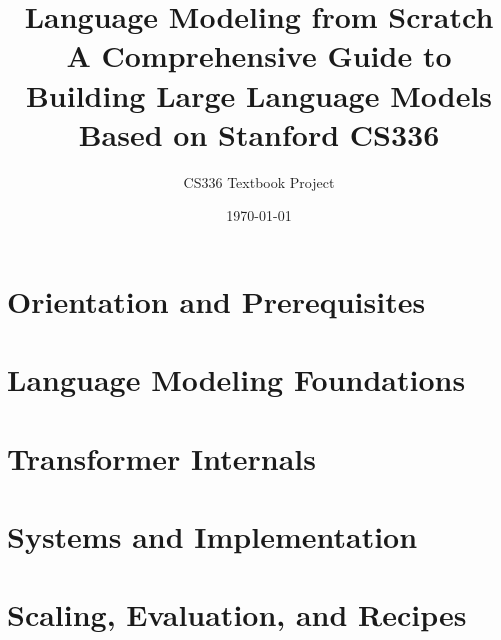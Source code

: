 \documentclass[11pt, openright, twoside]{book}
\title{
  \Huge\bfseries Language Modeling from Scratch \\[12pt]
  \Large A Comprehensive Guide to Building Large Language Models \\[8pt]
  \large Based on Stanford CS336
}
\author{CS336 Textbook Project}
\date{\today}
\theoremstyle{definition}
\theoremstyle{plain}
\theoremstyle{remark}
\begin{document}
\frontmatter
\maketitle

\tableofcontents
\listoffigures
\listoftables

\mainmatter

\part{Orientation and Prerequisites}







\part{Language Modeling Foundations}




\part{Transformer Internals}






\part{Systems and Implementation}






\part{Scaling, Evaluation, and Recipes}



\end{document}
